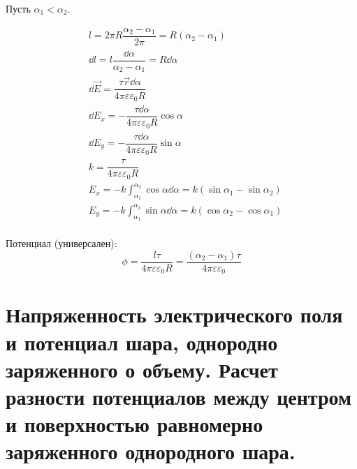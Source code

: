 \documentclass[12pt]{report}
\begin{document}
Пусть $\alpha_1 < \alpha_2$.

\begin{align*}
     & l = 2\pi R \dfrac{\alpha_2 - \alpha_1}{2\pi} = R(\alpha_2 - \alpha_1)                          \\
     & \dd l = l \dfrac{\dd \alpha}{\alpha_2 - \alpha_1} = R \dd \alpha                               \\
     & \dd \vec E = \dfrac{\tau \vec{r} \dd \alpha}{4 \pi \varepsilon \varepsilon_0 R}                \\
     & \dd E_x = -\dfrac{\tau \dd \alpha}{4 \pi \varepsilon \varepsilon_0 R} \cos \alpha              \\
     & \dd E_y = -\dfrac{\tau \dd \alpha}{4 \pi \varepsilon \varepsilon_0 R} \sin \alpha              \\
     & k = \dfrac{\tau}{4\pi \varepsilon \varepsilon_0 R}                                             \\
     & E_x = -k \int_{\alpha_1}^{\alpha_2} \cos \alpha \dd \alpha = k (\sin \alpha_1 - \sin \alpha_2) \\
     & E_y = -k \int_{\alpha_1}^{\alpha_2} \sin \alpha \dd \alpha = k (\cos \alpha_2 - \cos \alpha_1) \\
\end{align*}

Потенциал (универсален):
\[
    \phi = \dfrac{l \tau}{4\pi \varepsilon\varepsilon_0 R}
    = \dfrac{(\alpha_2 - \alpha_1)\tau}{4\pi \varepsilon\varepsilon_0}
\]

\setcounter{section}{6}
\section{Напряженность электрического поля и потенциал шара, однородно заряженного о объему. Расчет разности потенциалов между центром и поверхностью равномерно заряженного однородного шара.}
\end{document}
